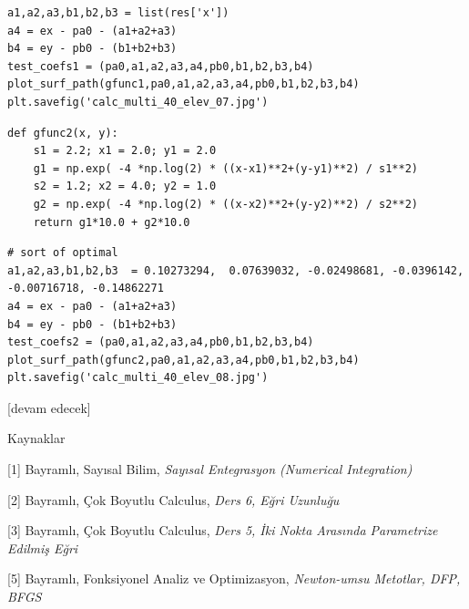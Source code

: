 \documentclass[12pt,fleqn]{article}\usepackage{../../common}
\begin{document}
\begin{verbatim}
a1,a2,a3,b1,b2,b3 = list(res['x'])
a4 = ex - pa0 - (a1+a2+a3)
b4 = ey - pb0 - (b1+b2+b3)
test_coefs1 = (pa0,a1,a2,a3,a4,pb0,b1,b2,b3,b4)
plot_surf_path(gfunc1,pa0,a1,a2,a3,a4,pb0,b1,b2,b3,b4)
plt.savefig('calc_multi_40_elev_07.jpg')
\end{verbatim}

\begin{verbatim}
def gfunc2(x, y):
    s1 = 2.2; x1 = 2.0; y1 = 2.0
    g1 = np.exp( -4 *np.log(2) * ((x-x1)**2+(y-y1)**2) / s1**2)
    s2 = 1.2; x2 = 4.0; y2 = 1.0
    g2 = np.exp( -4 *np.log(2) * ((x-x2)**2+(y-y2)**2) / s2**2)
    return g1*10.0 + g2*10.0
\end{verbatim}


\begin{verbatim}
# sort of optimal
a1,a2,a3,b1,b2,b3  = 0.10273294,  0.07639032, -0.02498681, -0.0396142,  -0.00716718, -0.14862271
a4 = ex - pa0 - (a1+a2+a3)
b4 = ey - pb0 - (b1+b2+b3)
test_coefs2 = (pa0,a1,a2,a3,a4,pb0,b1,b2,b3,b4)
plot_surf_path(gfunc2,pa0,a1,a2,a3,a4,pb0,b1,b2,b3,b4)
plt.savefig('calc_multi_40_elev_08.jpg')
\end{verbatim}






[devam edecek]

Kaynaklar 

[1] Bayramlı, Sayısal Bilim, {\em Sayısal Entegrasyon (Numerical Integration)}

[2] Bayramlı, Çok Boyutlu Calculus, {\em Ders 6, Eğri Uzunluğu}

[3] Bayramlı, Çok Boyutlu Calculus, {\em Ders 5, İki Nokta Arasında Parametrize Edilmiş Eğri}

[5] Bayramlı, Fonksiyonel Analiz ve Optimizasyon, {\em Newton-umsu Metotlar, DFP, BFGS }
\end{document}
